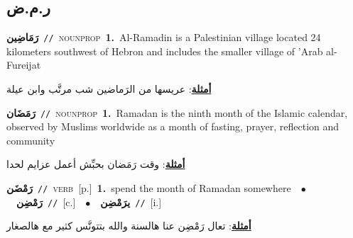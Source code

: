 \documentclass[10pt,a4paper,twoside]{article} %
\begin{document}
\begin{multicols}{2}
\vspace{-3mm}
\subsection*{\color{blue}\foreignlanguage{arabic}{ر.م.ض}\color{blue}{}} 

{\setlength\topsep{0pt}\textbf{\foreignlanguage{arabic}{رَمَاضِين}}\ {\color{gray}\texttt{//}\color{black}}\ \textsc{noun\textunderscore prop}\ \textbf{1.}~Al-Ramadin is a Palestinian village located 24 kilometers southwest of Hebron and includes the smaller village of 'Arab al-Fureijat\  \begin{flushright}\color{gray}\foreignlanguage{arabic}{\textbf{\underline{\foreignlanguage{arabic}{أمثلة}}}: عريسها من الرَماضين شب مرتَّب وابن عيلة}\end{flushright}\color{black}} \vspace{2mm}

{\setlength\topsep{0pt}\textbf{\foreignlanguage{arabic}{رَمَضَان}}\ {\color{gray}\texttt{//}\color{black}}\ \textsc{noun\textunderscore prop}\ \textbf{1.}~Ramadan is the ninth month of the Islamic calendar, observed by Muslims worldwide as a month of fasting, prayer, reflection and community\  \begin{flushright}\color{gray}\foreignlanguage{arabic}{\textbf{\underline{\foreignlanguage{arabic}{أمثلة}}}: وقت رَمَضان بحبِّش أعمل عزايم لحدا}\end{flushright}\color{black}} \vspace{2mm}

{\setlength\topsep{0pt}\textbf{\foreignlanguage{arabic}{رَمْضَن}}\ {\color{gray}\texttt{//}\color{black}}\ \textsc{verb}\ [p.]\ \textbf{1.}~spend the month of Ramadan somewhere\ \ $\bullet$\ \ \setlength\topsep{0pt}\textbf{\foreignlanguage{arabic}{رَمْضِن}}\ {\color{gray}\texttt{//}\color{black}}\ [c.]\ \ $\bullet$\ \ \setlength\topsep{0pt}\textbf{\foreignlanguage{arabic}{يرَمْضِن}}\ {\color{gray}\texttt{//}\color{black}}\ [i.]\  \begin{flushright}\color{gray}\foreignlanguage{arabic}{\textbf{\underline{\foreignlanguage{arabic}{أمثلة}}}: تعال رَمْضِن عنا هالسنة والله بتتونَّس كثير مع هالصغار}\end{flushright}\color{black}} \vspace{2mm}


\end{multicols}
\end{document}
